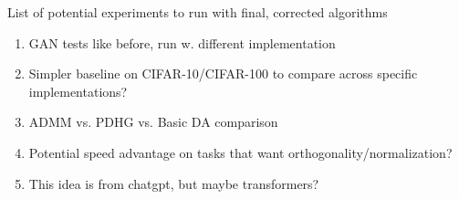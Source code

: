 \documentclass[12pt]{article}
\begin{document}
List of potential experiments to run with final, corrected algorithms
\begin{enumerate}
    \item GAN tests like before, run w. different implementation
    \item Simpler baseline on CIFAR-10/CIFAR-100 to compare across specific implementations?
    \item ADMM vs. PDHG vs. Basic DA comparison
    \item Potential speed advantage on tasks that want orthogonality/normalization?
    \item This idea is from chatgpt, but maybe transformers?
\end{enumerate}

\newpage

\printbibliography
\end{document}
